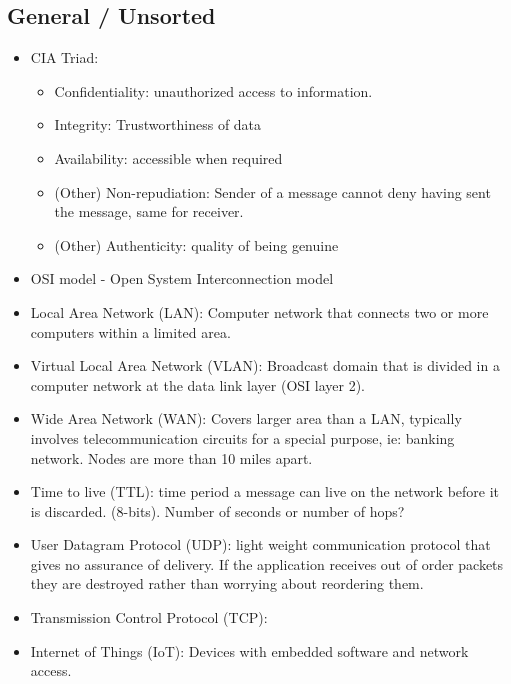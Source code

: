 \subsection{General / Unsorted}
\begin{itemize}
    \item CIA Triad:
    \begin{itemize}
        \item Confidentiality: unauthorized access to information.
        \item Integrity: Trustworthiness of data
        \item Availability: accessible when required
        \item (Other) Non-repudiation: Sender of a message cannot deny having sent the message, same for receiver.
        \item (Other) Authenticity: quality of being genuine
    \end{itemize}
    \item OSI model - Open System Interconnection model
    \item Local Area Network (LAN): Computer network that connects two or more computers within a limited area.
    \item Virtual Local Area Network (VLAN): Broadcast domain that is divided in a computer network at the data link layer (OSI layer 2).
    \item Wide Area Network (WAN): Covers larger area than a LAN, typically involves telecommunication circuits for a special purpose, ie: banking network. Nodes are more than 10 miles apart.
    \item Time to live (TTL): time period a message can live on the network before it is discarded. (8-bits). Number of seconds or number of hops?
    \item User Datagram Protocol (UDP): light weight communication protocol that gives no assurance of delivery.
    If the application receives out of order packets they are destroyed rather than worrying about reordering them.
    \item Transmission Control Protocol (TCP):
    \item Internet of Things (IoT): Devices with embedded software and network access.
   

\end{itemize}
